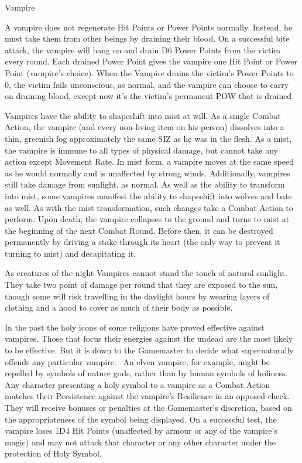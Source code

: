 \begin{monsterbox}{Vampire}
	\begin{rpg-monsteraction}
                A vampire does not regenerate Hit Points or Power Points normally. Instead, he must take them from other beings by draining their blood. On a successful bite attack, the vampire will hang on and drain D6 Power Points from the victim every round. Each drained Power Point gives the vampire one Hit Point or Power Point (vampire’s choice). When the Vampire drains the victim’s Power Points to 0, the victim fails unconscious, as normal, and the vampire can choose to carry on draining blood, except now it’s the victim’s permanent POW that is drained.
	\end{rpg-monsteraction}
	\begin{rpg-monsteraction}[Shapeshifting]
		Vampires have the ability to shapeshift into mist at will. As a single Combat Action, the vampire (and every non-living item on his person) dissolves into a thin, greenish fog approximately the same SIZ as he was in the flesh. As a mist, the vampire is immune to all types of physical damage, but cannot take any action except Movement Rate. In mist form, a vampire moves at the same speed as he would normally and is unaffected by strong winds. Additionally, vampires still take damage from sunlight, as normal.
		As well as the ability to transform into mist, some vampires manifest the ability to shapeshift into wolves and bats as well. As with the mist transformation, such changes take a Combat Action to perform.
		Upon death, the vampire collapses to the ground and turns to mist at the beginning of the next Combat Round. Before then, it can be destroyed permanently by driving a stake through its heart (the only way to prevent it turning to mist) and decapitating it.
	\end{rpg-monsteraction}
	\begin{rpg-monsteraction}
		As creatures of the night Vampires cannot stand the touch of natural sunlight. They take two point of damage per round that they are exposed to the sun, though some will risk travelling in the daylight hours by wearing layers of clothing and a hood to cover as much of their body as possible.
	\end{rpg-monsteraction}
	\begin{rpg-monsteraction}
		In the past the holy icons of some religions have proved effective against vampires. Those that focus their energies against the undead are the most likely to be effective. But it is down to the Gamemaster to decide what supernaturally offends any particular vampire.  An elven vampire, for example, might be repelled by symbols of nature gods, rather than by human symbols of holiness. Any character presenting a holy symbol to a vampire as a Combat Action matches their Persistence against the vampire’s Resilience in an opposed check. They will receive bonuses or penalties at the Gamemaster’s discretion, based on the appropriateness of the symbol being displayed. On a successful test, the vampire loses 1D4 Hit Points (unaffected by armour or any of the vampire’s magic) and may not attack that character or any other character under the protection of Holy Symbol.
	\end{rpg-monsteraction}
\end{monsterbox}
